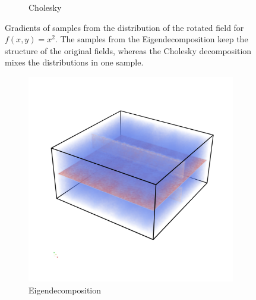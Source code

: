\begin{figure}
\begin{subfigure}[b]{0.49\textwidth}
        \caption{Cholesky}
        \label{fig:sampleChol}
    \end{subfigure}
    \caption{Gradients of samples from the distribution of the rotated
    field for $f(x,y)=x^2$. The samples from the Eigendecomposition
    keep the structure of the original fields, whereas the Cholesky
    decomposition mixes the distributions in one sample.}
    \label{fig:MDsampComp}
\end{figure}

\begin{figure}
    \begin{subfigure}[b]{0.49\textwidth}
        \includegraphics[width=\textwidth]{Images/shiftXold.png}
        \caption{Eigendecomposition}
        \label{fig:MCeigen}
    \end{subfigure}
    \begin{subfigure}[b]{0.49\textwidth}

\end{subfigure}
\end{figure}
